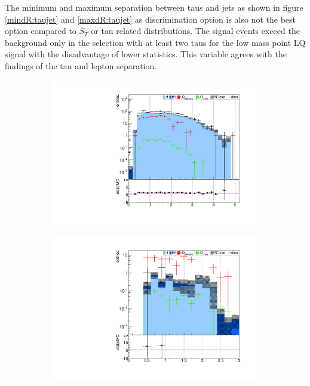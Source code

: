 %
The minimum and maximum separation between taus and jets as shown in figure \ref{mindR:taujet} and \ref{maxdR:taujet} as discrimination option is also not the best option compared to $S_T$ or tau related distributions. The signal events exceed the background only in the selection with at least two taus for the low mass point LQ signal with the disadvantage of lower statistics. This variable agrees with the findings of the tau and lepton separation. \par
%
\begin{figure}
  \centering
                \begin{subfigure}[t]{0.49\textwidth}
                \includegraphics[width=\textwidth]{figures/plots/kinLQ75/mindR_taujet_2j2b_1tau.pdf}
                \label{mindR:taujet:2b1tau}
                \end{subfigure}
                \begin{subfigure}[t]{0.49\textwidth}
                \includegraphics[width=\textwidth]{figures/plots/kinLQ75/mindR_taujet_2j2b_2tau.pdf}

\end{subfigure}
\end{figure}
